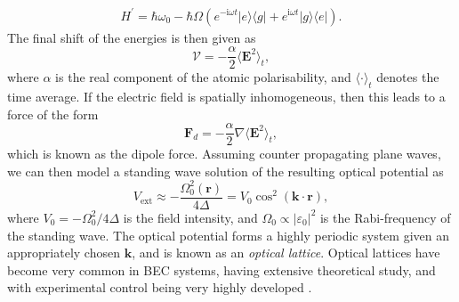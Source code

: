 \begin{align}
 H^{'} = \hbar\omega_0 - \hbar\Omega\left(e^{-\textrm{i}\omega t}|e\rangle\langle g|   + e^{\textrm{i}\omega t}|g\rangle\langle e|  \right).
\end{align}
The final shift of the energies is then given as
\begin{equation}\label{eqn:acshift}
\mathcal{V} = -\frac{\alpha}{2}\langle \mathbf{E}^2\rangle_t ,
\end{equation}
where $\alpha$ is the real component of the atomic polarisability, and $\langle \cdot \rangle_t$ denotes the time average. If the electric field is spatially inhomogeneous, then this leads to a force of the form
\begin{equation}
\mathbf{F}_d = -\frac{\alpha}{2}\nabla\langle \mathbf{E}^2 \rangle_t ,
\end{equation}
which is known as the dipole force. Assuming counter propagating plane waves, we can then model a standing wave solution of the resulting optical potential as
\begin{equation}
    V_{\textrm{ext}} \approx -\frac{\Omega_0^2(\mathbf{r})}{4\Delta}  = V_0 \cos^2 (\mathbf{k} \cdot \mathbf{r}),
\end{equation}
where $V_0 = -\Omega_0^2/4\Delta$ is the field intensity, and $\Omega_0 \propto |\varepsilon_0|^2$ is the Rabi-frequency of the standing wave. The optical potential forms a highly periodic system given an appropriately chosen $\mathbf{k}$, and is known as an \textit{optical lattice}. Optical lattices have become very common in BEC systems, having extensive theoretical study, and with experimental control being very highly developed \cite{OL:Greiner_nat_2002,OL:Reijnders_prl_2004,OL:Sorensen_prl_2005,Vtx:Tung_prl_2006,Vtx:Vignolo_pra_2007}.

